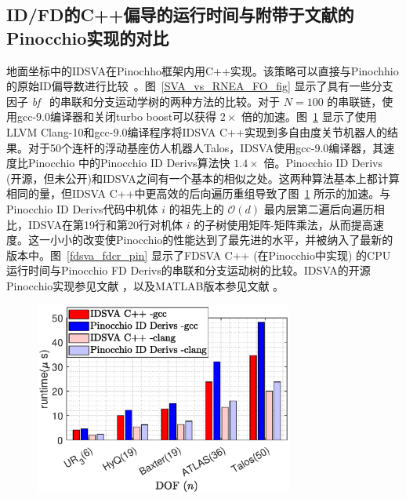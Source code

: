 \documentclass[letterpaper, 10 pt, conference]{ieeetran}  %
\begin{document}
\subsection{ID/FD的C++偏导的运行时间与附带于文献\cite{car}的Pinocchio实现的对比}
地面坐标中的IDSVA在Pinochho框架内用C++实现。该策略可以直接与Pinochhio的原始ID偏导数进行比较~\cite{car_code}。图~\ref{SVA_vs_RNEA_FO_fig} 显示了具有一些分支因子 \textit{bf} ~\cite{rbd}的串联和分支运动学树的两种方法的比较。对于 $N=100$ 的串联链，使用gcc-9.0编译器和关闭turbo boost可以获得 $2 \times$ 倍的加速。图~\ref{pin_comparison} 显示了使用LLVM Clang-10和gcc-9.0编译程序将IDSVA C++实现到多自由度关节机器人的结果。对于50个连杆的浮动基座仿人机器人Talos，IDSVA使用gcc-9.0编译器，其速度比Pinocchio \cite{car_code} 中的Pinocchio ID Derivs算法快 $1.4 \times$ 倍。Pinocchio ID Derivs (开源，但未公开)和IDSVA之间有一个基本的相似之处。这两种算法基本上都计算相同的量，但IDSVA C++中更高效的后向遍历重组导致了图~\ref{pin_comparison} 所示的加速。与Pinocchio ID Derivs代码中机体 $i$ 的祖先上的 $\mathcal{O}(d)$ 最内层第二遍后向遍历相比，IDSVA在第19行和第20行对机体 $i$ 的子树使用矩阵-矩阵乘法，从而提高速度。这一小小的改变使Pinocchio的性能达到了最先进的水平，并被纳入了最新的版本中。图~\ref{fdsva_fdcr_pin} 显示了FDSVA C++ (在Pinocchio中实现) 的CPU运行时间与Pinocchio FD Derivs的串联和分支运动树的比较。IDSVA的开源Pinocchio实现参见文献 \cite{cppsource}，以及MATLAB版本参见文献 \cite{matlabsource}。
 
\begin{figure}[tb]
\hspace{-0.5cm}
\center
\includegraphics[width=8.5cm]{rneacr_vs_idsva_bar_clang_gcc_ral_w_march_ral.eps}
\caption{ }
\label{pin_comparison}
\end{figure}
\end{document}

